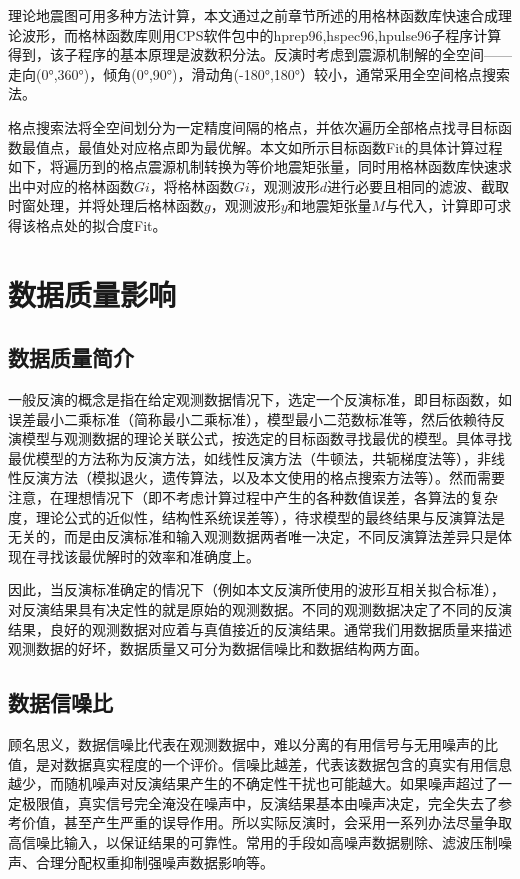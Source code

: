 理论地震图可用多种方法计算，本文通过之前章节所述的用格林函数库快速合成理论波形，而格林函数库则用CPS软件包中的hprep96,hspec96,hpulse96子程序计算得到，该子程序的基本原理是波数积分法。反演时考虑到震源机制解的全空间——走向(0°,360°)，倾角(0°,90°)，滑动角(-180°,180°）较小，通常采用全空间格点搜索法。

格点搜索法将全空间划分为一定精度间隔的格点，并依次遍历全部格点找寻目标函数最值点，最值处对应格点即为最优解。本文如所示目标函数Fit的具体计算过程如下，将遍历到的格点震源机制转换为等价地震矩张量\citep{Jost1989}，同时用格林函数库快速求出中对应的格林函数$Gi$，将格林函数$Gi$，观测波形$d$进行必要且相同的滤波、截取时窗处理，并将处理后格林函数$g$，观测波形$y$和地震矩张量$M$与代入，计算即可求得该格点处的拟合度Fit。


\section{数据质量影响}

\subsection{数据质量简介}

一般反演的概念是指在给定观测数据情况下，选定一个反演标准，即目标函数，如误差最小二乘标准（简称最小二乘标准），模型最小二范数标准等，然后依赖待反演模型与观测数据的理论关联公式，按选定的目标函数寻找最优的模型。具体寻找最优模型的方法称为反演方法，如线性反演方法（牛顿法，共轭梯度法等），非线性反演方法（模拟退火，遗传算法，以及本文使用的格点搜索方法等）。然而需要注意，在理想情况下（即不考虑计算过程中产生的各种数值误差，各算法的复杂度，理论公式的近似性，结构性系统误差等），待求模型的最终结果与反演算法是无关的，而是由反演标准和输入观测数据两者唯一决定，不同反演算法差异只是体现在寻找该最优解时的效率和准确度上。

因此，当反演标准确定的情况下（例如本文反演所使用的波形互相关拟合标准），对反演结果具有决定性的就是原始的观测数据。不同的观测数据决定了不同的反演结果，良好的观测数据对应着与真值接近的反演结果。通常我们用数据质量来描述观测数据的好坏，数据质量又可分为数据信噪比和数据结构两方面。

\subsection{数据信噪比}

顾名思义，数据信噪比代表在观测数据中，难以分离的有用信号与无用噪声的比值，是对数据真实程度的一个评价。信噪比越差，代表该数据包含的真实有用信息越少，而随机噪声对反演结果产生的不确定性干扰也可能越大。如果噪声超过了一定极限值，真实信号完全淹没在噪声中，反演结果基本由噪声决定，完全失去了参考价值，甚至产生严重的误导作用。所以实际反演时，会采用一系列办法尽量争取高信噪比输入，以保证结果的可靠性。常用的手段如高噪声数据剔除、滤波压制噪声、合理分配权重抑制强噪声数据影响等。

